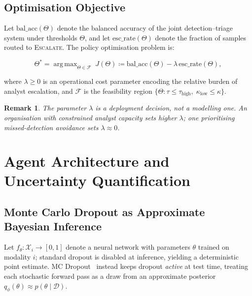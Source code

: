 \documentclass[journal]{IEEEtran}
\DeclareMathOperator*{\argmax}{arg\,max}
\newtheorem{remark}{Remark}
\begin{document}
\subsection{Optimisation Objective}

Let $\text{bal\_acc}(\Theta)$ denote the balanced accuracy of the joint
detection--triage system under thresholds $\Theta$, and let
$\text{esc\_rate}(\Theta)$ denote the fraction of samples routed to
\textsc{Escalate}. The policy optimisation problem is:

\begin{equation}\label{eq:objective}
  \Theta^* = \argmax_{\Theta \in \mathcal{F}} \;
  J(\Theta) \coloneqq \text{bal\_acc}(\Theta)
  - \lambda\,\text{esc\_rate}(\Theta),
\end{equation}

where $\lambda \geq 0$ is an operational cost parameter encoding the relative
burden of analyst escalation, and $\mathcal{F}$ is the feasibility region
$\{\Theta : \tau \leq \tau_{\text{high}},\; \kappa_{\text{low}} \leq
\kappa\}$.

\begin{remark}
The parameter $\lambda$ is a deployment decision, not a modelling one. An
organisation with constrained analyst capacity sets higher $\lambda$; one
prioritising missed-detection avoidance sets $\lambda \approx 0$.
\end{remark}

\section{Agent Architecture and Uncertainty Quantification}\label{sec:agents}

\subsection{Monte Carlo Dropout as Approximate Bayesian Inference}

Let $f_\theta : \mathcal{X}_i \to [0,1]$ denote a neural network with
parameters $\theta$ trained on modality $i$; standard dropout is disabled
at inference, yielding a deterministic point estimate. MC
Dropout~\cite{gal2016dropout} instead keeps dropout \emph{active} at test
time, treating each stochastic forward pass as a draw from an approximate
posterior $q_\phi(\theta) \approx p(\theta \mid \mathcal{D})$.
\end{document}
